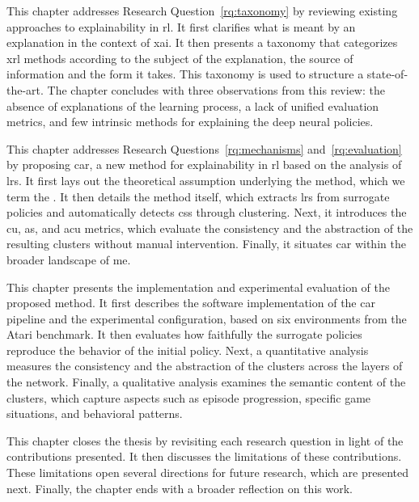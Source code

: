 \begin{description}[style=nextline, leftmargin=1.5em, itemsep=0.5em]
\item[\textcolor{mygreen}{\textbf{Explainability in Reinforcement Learning (Chapter~\ref{chap:explainability_in_reinforcement_learning}, survey)}}]
This chapter addresses Research Question~\ref{rq:taxonomy} by reviewing existing approaches to explainability in \gls{rl}.
It first clarifies what is meant by an explanation in the context of \gls{xai}.
It then presents a taxonomy that categorizes \gls{xrl} methods according to the subject of the explanation, the source of information and the form it takes.
This taxonomy is used to structure a state-of-the-art.
The chapter concludes with three observations from this review: the absence of explanations of the learning process, a lack of unified evaluation metrics, and few intrinsic methods for explaining the deep neural policies.

\item[\textcolor{myred}{\textbf{The CAR Method (Chapter~\ref{chap:clustering_agent_representations}, method)}}]
This chapter addresses Research Questions~\ref{rq:mechanisms} and~\ref{rq:evaluation} by proposing \gls{car}, a new method for explainability in \gls{rl} based on the analysis of \glspl{lr}.
It first lays out the theoretical assumption underlying the method, which we term the \RepresentationConvergenceHypothesisName.
It then details the method itself, which extracts \glspl{lr} from surrogate policies and automatically detects \glspl{cs} through clustering.
Next, it introduces the \gls{cu}, \gls{as}, and \gls{acu} metrics, which evaluate the consistency and the abstraction of the resulting clusters without manual intervention.
Finally, it situates \gls{car} within the broader landscape of \gls{me}.

\item[\textcolor{myred}{\textbf{Evaluation of the CAR Method (Chapter~\ref{chap:experiments}, method)}}]
This chapter presents the implementation and experimental evaluation of the proposed method.
It first describes the software implementation of the \gls{car} pipeline and the experimental configuration, based on six environments from the Atari benchmark.
It then evaluates how faithfully the surrogate policies reproduce the behavior of the initial policy.
Next, a quantitative analysis measures the consistency and the abstraction of the clusters across the layers of the network.
Finally, a qualitative analysis examines the semantic content of the clusters, which capture aspects such as episode progression, specific game situations, and behavioral patterns.

\item[\textbf{Conclusion (Chapter~\ref{chap:conclusion})}]
This chapter closes the thesis by revisiting each research question in light of the contributions presented.
It then discusses the limitations of these contributions.
These limitations open several directions for future research, which are presented next.
Finally, the chapter ends with a broader reflection on this work.
\end{description}


